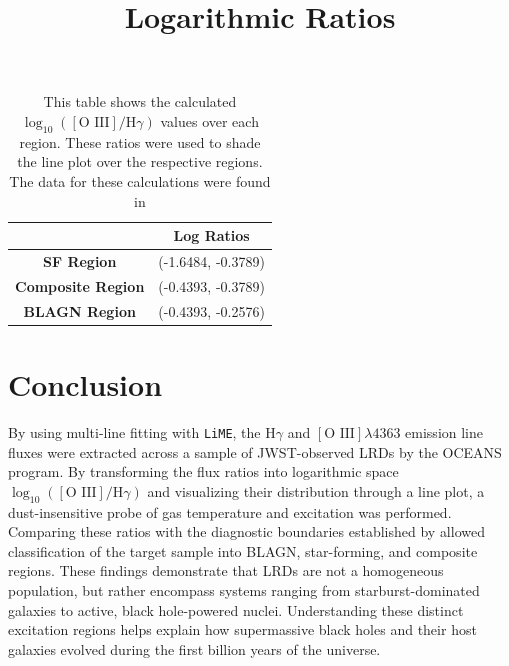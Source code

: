 \documentclass[twoside,twocolumn,10pt]{article}
\begin{document}
\textit{
}


\begin{table}[htbp]
    \centering
    \title{Logarithmic Ratios}
    \label{tab:sample_table}
  
  \begin{tabular}{|c|c|}
    \hline
    \textbf{} & \textbf{Log Ratios} \\ \hline
    \textbf{SF Region} & (-1.6484, -0.3789) \\ \hline
    \textbf{Composite Region} & (-0.4393, -0.3789) \\ \hline
    \textbf{BLAGN Region} & (-0.4393, -0.2576) \\ \hline
  \end{tabular}
  
\vspace{2mm} %
    \caption {This table shows the calculated $\log_{10}([\text{O III}]/\text{H}\gamma)$ values over each region. These ratios were used to shade the line plot over the respective regions. The data for these calculations were found in \citet{Backhaus2025}}
\end{table}

\section{Conclusion}

By using multi-line fitting with \texttt{LiME}, the $\text{H}\gamma$ and $[\text{O III}] \lambda 4363$ emission line fluxes were extracted across a sample of JWST-observed LRDs by the OCEANS program. By transforming the flux ratios into logarithmic space $\log_{10}([\text{O III}]/\text{H}\gamma)$ and visualizing their distribution through a line plot, a dust-insensitive probe of gas temperature and excitation was performed.
Comparing these ratios with the diagnostic boundaries established by \citet{Backhaus2025} allowed classification of the target sample into BLAGN, star-forming, and composite regions. These findings demonstrate that LRDs are not a homogeneous population, but rather encompass systems ranging from starburst-dominated galaxies to active, black hole-powered nuclei. Understanding these distinct excitation regions helps explain how supermassive black holes and their host galaxies evolved during the first billion years of the universe.\textit{
}


\end{document}
